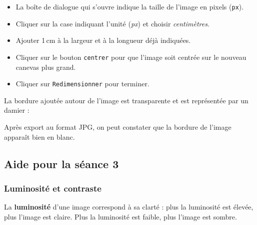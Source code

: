 \begin{minipage}[c]{.38\textwidth}
\begin{itemize}
\item La boîte de dialogue qui s'ouvre indique la taille de l'image en pixels (\texttt{px}).
\end{itemize}
\end{minipage}\hfill%
\begin{minipage}[c]{.58\textwidth}
\end{minipage}

\begin{itemize}
\item Cliquer sur la case indiquant l'unité (\emph{px}) et choisir \emph{centimètres}.
\item Ajouter 1\,cm à la largeur et à la longueur déjà indiquées.
\item Cliquer sur le bouton \texttt{centrer} pour que l'image soit centrée sur le nouveau canevas plus grand.
\item Cliquer sur \texttt{Redimensionner} pour terminer.
\end{itemize}


La bordure ajoutée autour de l'image est transparente et est représentée par un damier :

Après export au format JPG, on peut constater que la bordure de l'image apparaît bien en blanc.



\subsection{Aide pour la séance 3}


\subsubsection{Luminosité et contraste}\label{GimpLumiContraste}


La \textbf{luminosité} d'une image correspond à sa clarté : plus la luminosité est élevée, plus l'image est claire. Plus la luminosité est faible, plus l'image est sombre.

\vspace{12pt}

